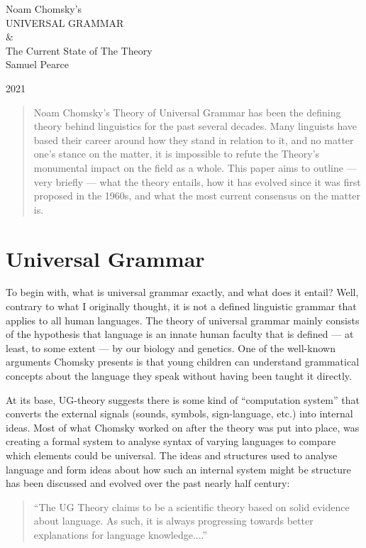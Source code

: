 \documentclass[a4paper,10pt]{article}
\begin{document}
\begingroup%
\centering
\vfill
\Huge{Noam Chomsky's}\\[0.5\baselineskip]
\Huge {UNIVERSAL GRAMMAR}\\
\Huge{\&}\\
\Huge{The Current State of The Theory}\\[\baselineskip]
\Large {Samuel Pearce}\par
\large{\scshape 2021}\par
\vfill\null
\endgroup

\begin{abstract}
    Noam Chomsky's Theory of Universal Grammar has been the defining
    theory behind linguistics for the past several decades. Many
    linguists have based their career around how they stand in relation
    to it, and no matter one's stance on the matter, it is impossible
    to refute the Theory's monumental impact on the field as a whole.
    This paper aims to outline --- very briefly --- what the theory
    entails, how it has evolved since it was first proposed in the
    1960s, and what the most current consensus on the matter is.
\end{abstract}

\pagebreak


\tableofcontents
\pagebreak


\section{Universal Grammar}
To begin with, what is universal grammar exactly, and what does it entail? Well, contrary to what
I originally thought, it is not a defined linguistic grammar that applies to all human languages.
The theory of universal grammar mainly consists of the hypothesis that language is an innate human
faculty that is defined --- at least, to some extent --- by our biology and genetics. One of the
well-known arguments Chomsky presents is that young children can understand grammatical concepts
about the language they speak without having been taught it directly.\citep[p.~26]{ChUGAI}

At its base, UG-theory suggests there is some kind of ``computation system'' that converts the
external signals (sounds, symbols, sign-language, etc.) into internal ideas. \citep[p.~5]{ChUGAI}
Most of what Chomsky worked on after the theory was put into place, was creating a formal system
to analyse syntax of varying languages to compare which elements could be universal. The ideas
and structures used to analyse language and form ideas about how such an internal system might
be structure has been discussed and evolved over the past nearly half century:
\begin{quote}
	``The UG Theory claims to be a scientific theory based on solid evidence about language.
	As such, it is always progressing towards better explanations for language knowledge....''
	
	\citep[p.~27]{ChUGAI}
\end{quote}
\end{document}
